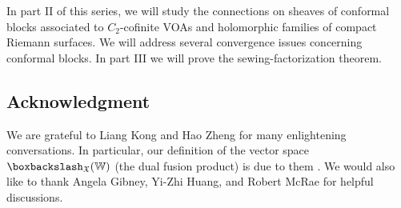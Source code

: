 \documentclass[11pt,b5paper,notitlepage]{article}
\theoremstyle{definition}
\theoremstyle{plain}
\newcommand{\Wbb}{\mathbb W}
\newcommand{\<}{\left\langle}
\renewcommand{\>}{\right\rangle}
\newcommand{\fx}{\mathfrak{X}}
\newcommand{\bbs}{\boxbackslash}
\numberwithin{equation}{subsection}
\begin{document}
In part II of this series, we will study the connections on sheaves of conformal blocks associated to $C_2$-cofinite VOAs and holomorphic families of compact Riemann surfaces. We will address several convergence issues concerning conformal blocks. In part III we will prove the sewing-factorization theorem.


\subsection*{Acknowledgment}


We are grateful to Liang Kong and Hao Zheng for many enlightening conversations. In particular, our definition of the vector space $\bbs_\fx(\Wbb)$ (the dual fusion product) is due to them \cite{KZ-conformal-block}. We would also like to thank Angela Gibney, Yi-Zhi Huang, and Robert McRae for helpful discussions.
\end{document}
